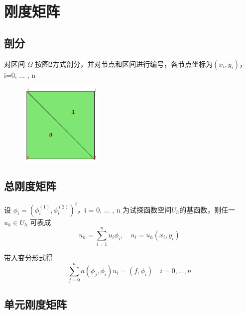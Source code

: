 \documentclass[UTF8,titlepage,twocolumn]{ctexart}
\begin{document}
\section{刚度矩阵}

\subsection{剖分}

对区间 $\Omega$ 按图2方式剖分，并对节点和区间进行编号，各节点坐标为$(x_i,y_i)$， i=0, ... , n

\begin{figure}[hb]
	\centering
	\includegraphics[height=4cm,width=4cm]{../image/subdivsion.png}
	\caption{}
\end{figure}

\subsection{总刚度矩阵}

设 $\phi_i = (\phi_i^{(1)}, \phi_i^{(2)})^t$，i = 0, ... , n 为试探函数空间$U_h$的基函数，则任一 $u_h \in U_h$ 可表成
$$
	u_h = \sum\limits_{i=1}^n u_i \phi_i, \quad u_i = u_h(x_i,y_i)
$$ 

带入变分形式得
$$
	\sum\limits_{j=0}^n a(\phi_j, \phi_i) u_i = (f,\phi_i) \quad i=0, ... ,n
$$

\subsection{单元刚度矩阵}
\end{document}

